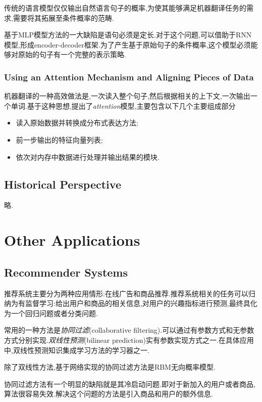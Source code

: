 传统的语言模型仅仅输出自然语言句子的概率,为使其能够满足机器翻译任务的需求,需要将其拓展至条件概率的范畴.

基于MLP模型方法的一大缺陷是语句必须是定长.对于这个问题,可以借助于RNN模型,形成encoder-decoder框架.为了产生基于原始句子的条件概率,这个模型必须能够对原始的句子有一个完整的表示策略.

\subsubsection{Using an Attention Mechanism and Aligning Pieces of Data}

机器翻译的一种高效做法是,一次读入整个句子,然后根据相关的上下文,一次输出一个单词.基于这种思想,提出了\textit{attention}模型,主要包含以下几个主要组成部分
\begin{itemize}
    \item 读入原始数据并转换成分布式表达方法;
    \item 前一步输出的特征向量列表;
    \item 依次对内存中数据进行处理并输出结果的模块.
\end{itemize}

\subsection{Historical Perspective}

略.

\section{Other Applications}

\subsection{Recommender Systems}

推荐系统主要分为两种应用情形:在线广告和商品推荐.推荐系统相关的任务可以归纳为有监督学习:给出用户和商品的相关信息,对用户的兴趣指标进行预测,最终具化为一个回归问题或者分类问题.

常用的一种方法是\textit{协同过滤}(collaborative filtering).可以通过有参数方式和无参数方式分别实现.\textit{双线性预测}(bilinear prediction)实有参数实现方式之一.在具体应用中,双线性预测知识集成学习方法的学习器之一.

除了双线性方法,基于网络实现的协同过滤方法是RBM无向概率模型.

协同过滤方法有一个明显的缺陷就是其冷启动问题.即对于新加入的用户或者商品,算法很容易失效.解决这个问题的方法是引入商品和用户的额外信息.

